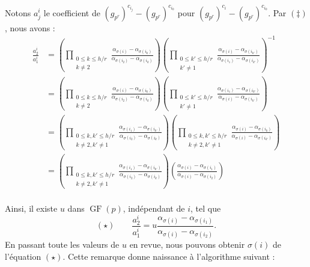 \documentclass[a4paper, titlepage]{article}
\theoremstyle{definition}
\theoremstyle{remark}
\def\gf{\operatorname{GF}}
\begin{document}
Notons $a_j^i$ le coefficient de $(g_{p^r})^{c_{i_{j}}} - (g_{p^r})^{c_{i_0}}$ pour $(g_{p^r})^{c_{i}} - (g_{p^r})^{c_{i_0}}$. Par $(\ddagger)$, nous avons :
\begin{align*}
\frac{a_2^i}{a_1^i} &= \left(\prod_{\substack{0\leqslant k\leqslant h/r \\ k \neq 2}} \frac{\alpha_{\sigma(i)}-\alpha_{\sigma(i_k)}}{\alpha_{\sigma(i_2)}-\alpha_{\sigma(i_k)}} \right)\left(\prod_{\substack{0\leqslant k'\leqslant h/r \\ k' \neq 1}} \frac{\alpha_{\sigma(i)}-\alpha_{\sigma(i_{k'})}}{\alpha_{\sigma(i_1)}-\alpha_{\sigma(i_{k'})}} \right)^{-1} \\
&= \left(\prod_{\substack{0\leqslant k\leqslant h/r \\ k \neq 2}} \frac{\alpha_{\sigma(i)}-\alpha_{\sigma(i_k)}}{\alpha_{\sigma(i_2)}-\alpha_{\sigma(i_k)}} \right)\left(\prod_{\substack{0\leqslant k' \leqslant h/r \\ k' \neq 1}} \frac{\alpha_{\sigma(i_1)}-\alpha_{\sigma(i_{k'})}}{\alpha_{\sigma(i)}-\alpha_{\sigma(i_{k'})}} \right) \\
&= \left(\prod_{\substack{0\leqslant k, k'\leqslant h/r \\ k \neq 2, k' \neq 1}} \frac{\alpha_{\sigma(i_1)}-\alpha_{\sigma(i_{k'})}}{\alpha_{\sigma(i_2)}-\alpha_{\sigma(i_k)}} \right) \left(\prod_{\substack{0\leqslant k, k'\leqslant h/r \\ k \neq 2, k' \neq 1}} \frac{\alpha_{\sigma(i)}-\alpha_{\sigma(i_k)}}{\alpha_{\sigma(i)}-\alpha_{\sigma(i_{k'})}} \right) \\
&= \left(\prod_{\substack{0\leqslant k, k'\leqslant h/r \\ k \neq 2, k' \neq 1}} \frac{\alpha_{\sigma(i_1)}-\alpha_{\sigma(i_{k'})}}{\alpha_{\sigma(i_2)}-\alpha_{\sigma(i_k)}} \right) \left(\frac{\alpha_{\sigma(i)}-\alpha_{\sigma(i_1)}}{\alpha_{\sigma(i)}-\alpha_{\sigma(i_2)}} \right) \\
\end{align*}

Ainsi, il existe $u$ dans $\gf(p)$, indépendant de $i$, tel que 
$$(\star) \qquad\frac{a_2^i}{a_1^i} = u \frac{\alpha_{\sigma(i)}-\alpha_{\sigma(i_1)}}{\alpha_{\sigma(i)}-\alpha_{\sigma(i_2)}}.$$
En passant toute les valeurs de $u$ en revue, nous pouvons obtenir $\sigma(i)$ de l'équation $(\star)$. Cette remarque donne naissance à l'algorithme suivant :
\end{document}
